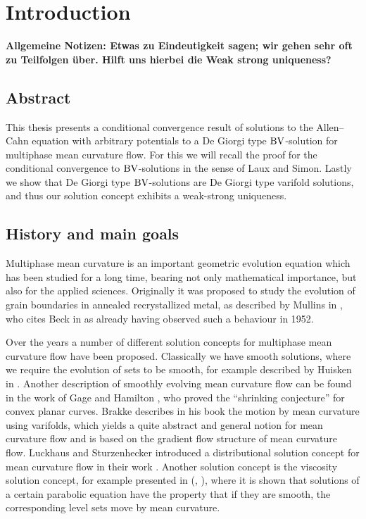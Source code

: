 \chapter{Introduction}

\textbf{Allgemeine Notizen: 
Etwas zu Eindeutigkeit sagen; wir gehen sehr oft zu Teilfolgen über. Hilft uns 
hierbei die Weak strong uniqueness?}

\section{Abstract}

This thesis presents a conditional convergence result of solutions to the 
Allen--Cahn equation with arbitrary potentials to a De Giorgi type $ \operatorname{BV} 
$-solution for multiphase mean 
curvature flow. For this we will recall the proof for the conditional 
convergence to $ \operatorname{BV} $-solutions in 
the sense of Laux and Simon. Lastly we show that De Giorgi type $ \operatorname{BV} 
$-solutions are De Giorgi type varifold solutions, and thus our solution 
concept exhibits a 
weak-strong uniqueness.

\section{History and main goals}

Multiphase mean curvature is an important geometric evolution equation which 
has been studied for a long time, bearing not only mathematical importance, but 
also for the applied sciences. Originally it was proposed to study the 
evolution of grain boundaries in annealed recrystallized metal, as described by
Mullins in \cite{mullins_two_dimensional_motion_of_idealized_grain_boundaries}, 
who cites Beck in \cite{beck_metal_interfaces} as already having observed such 
a behaviour in 1952. 

Over the years a number of different solution concepts for multiphase mean 
curvature flow have been proposed. Classically we have smooth solutions, where 
we require the evolution of sets to be smooth, for example described by Huisken 
in \cite{huisken_asymptotic_behavior_for_singuliarities_of_mcf}. 
Another description of smoothly evolving mean curvature flow can be found in 
the work of Gage and Hamilton 
\cite{gage_hamilton_the_heat_equation_shrinking_convex_plane_curves}, who 
proved the \enquote{shrinking conjecture} for convex planar curves.
Brakke describes in his book 
\cite{brakke_kenneth_motion_of_surface_by_mean_curvature} the motion by mean 
curvature using varifolds, which yields a quite abstract and general notion for 
mean curvature flow and is based on the gradient flow structure of mean 
curvature flow. 
Luckhaus and Sturzenhecker introduced a 
distributional solution concept for mean curvature flow in their work 
\cite{luckhaus_sturzenhecker_implicit_time_discretization_for_mcf}. Another 
solution concept is the viscosity solution concept, for example presented in 
(\cite{chen_giga_goto_uniqueness_and_existence_of_generalized_mcf_equations},
\cite{evans_spruck_motion_of_level_sets_by_mean_curvature}), where it is shown 
that solutions of a certain parabolic equation have the property that if they 
are smooth, the corresponding level sets move by mean curvature.

